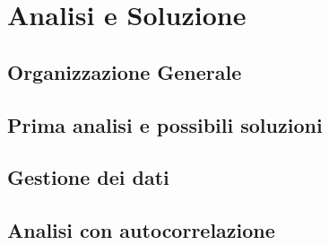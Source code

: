 \section{Analisi e Soluzione}





\subsection{Organizzazione Generale}
\subsection{Prima analisi e possibili soluzioni}
\subsection{Gestione dei dati}
\subsection{Analisi con autocorrelazione}
